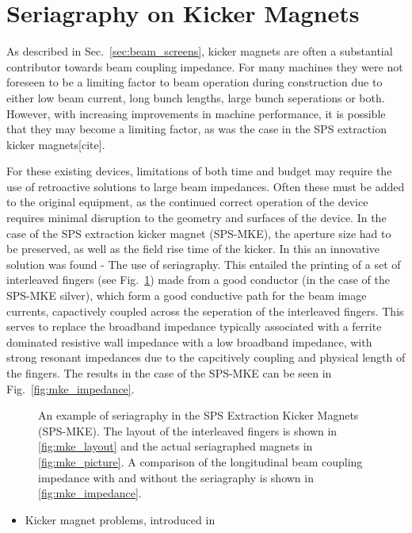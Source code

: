 \section{Seriagraphy on Kicker Magnets}
\label{sec:seriagraphy}

As described in Sec.~\ref{sec:beam_screens}, kicker magnets are often a substantial contributor towards beam coupling impedance. For many machines they were not foreseen to be a limiting factor to beam operation during construction due to either low beam current, long bunch lengths, large bunch seperations or both. However, with increasing improvements in machine performance, it is possible that they may become a limiting factor, as was the case in the SPS extraction kicker magnets[cite]. 

For these existing devices, limitations of both time and budget may require the use of retroactive solutions to large beam impedances. Often these must be added to the original equipment, as the continued correct operation of the device requires minimal disruption to the geometry and surfaces of the device. In the case of the SPS extraction kicker magnet (SPS-MKE), the aperture size had to be preserved, as well as the field rise time of the kicker. In this an innovative solution was found - The use of seriagraphy. This entailed the printing of a set of interleaved fingers (see Fig.~\ref{fig:mke_figures}) made from a good conductor (in the case of the SPS-MKE silver), which form a good conductive path for the beam image currents, capactively coupled across the seperation of the interleaved fingers. This serves to replace the broadband impedance typically associated with a ferrite dominated resistive wall impedance with a low broadband impedance, with strong resonant impedances due to the capcitively coupling and physical length of the fingers. The results in the case of the SPS-MKE can be seen in Fig.~\ref{fig:mke_impedance}.


\begin{figure}
\subfigure[]{

\label{fig:mke_layout}
}
\subfigure[]{

\label{fig:mke_picture}
}
\subfigure[]{

\label{fig:mke_impedance}
}

\caption{An example of seriagraphy in the SPS Extraction Kicker Magnets (SPS-MKE). The layout of the interleaved fingers is shown in \ref{fig:mke_layout} and the actual seriagraphed magnets in \ref{fig:mke_picture}. A comparison of the longitudinal beam coupling impedance with and without the seriagraphy is shown in \ref{fig:mke_impedance}.}
\label{fig:mke_figures}
\end{figure}

\begin{itemize}
\item{Kicker magnet problems, introduced in }

\end{itemize}